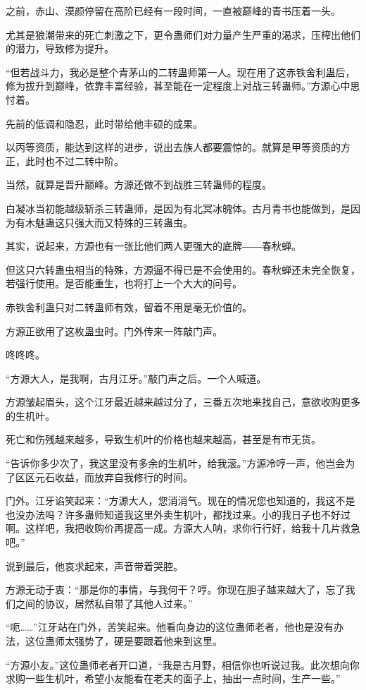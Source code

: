 \begin{this_body}
之前，赤山、漠颜停留在高阶已经有一段时间，一直被巅峰的青书压着一头。

尤其是狼潮带来的死亡刺激之下，更令蛊师们对力量产生严重的渴求，压榨出他们的潜力，导致修为提升。

“但若战斗力，我必是整个青茅山的二转蛊师第一人。现在用了这赤铁舍利蛊后，修为拔升到巅峰，依靠丰富经验，甚至能在一定程度上对战三转蛊师。”方源心中思忖着。

先前的低调和隐忍，此时带给他丰硕的成果。

以丙等资质，能达到这样的进步，说出去族人都要震惊的。就算是甲等资质的方正，此时也不过二转中阶。

当然，就算是晋升巅峰。方源还做不到战胜三转蛊师的程度。

白凝冰当初能越级斩杀三转蛊师，是因为有北冥冰魄体。古月青书也能做到，是因为有木魅蛊这只强大而又特殊的三转蛊虫。

其实，说起来，方源也有一张比他们两人更强大的底牌――春秋蝉。

但这只六转蛊虫相当的特殊，方源逼不得已是不会使用的。春秋蝉还未完全恢复，若强行使用。是否能重生，也将打上一个大大的问号。

赤铁舍利蛊只对二转蛊师有效，留着不用是毫无价值的。

方源正欲用了这枚蛊虫时。门外传来一阵敲门声。

咚咚咚。

“方源大人，是我啊，古月江牙。”敲门声之后。一个人喊道。

方源皱起眉头，这个江牙最近越来越过分了，三番五次地来找自己，意欲收购更多的生机叶。

死亡和伤残越来越多，导致生机叶的价格也越来越高，甚至是有市无货。

“告诉你多少次了，我这里没有多余的生机叶，给我滚。”方源冷哼一声，他岂会为了区区元石收益，而放弃自我修行的时间。

门外。江牙谄笑起来：“方源大人，您消消气。现在的情况您也知道的，我这不是也没办法吗？许多蛊师知道我这里外卖生机叶，都找过来。小的我日子也不好过啊。这样吧，我把收购价再提高一成。方源大人呐，求你行行好，给我十几片救急吧。”

说到最后，他哀求起来，声音带着哭腔。

方源无动于衷：“那是你的事情，与我何干？哼。你现在胆子越来越大了，忘了我们之间的协议，居然私自带了其他人过来。”

“呃……”江牙站在门外，苦笑起来。他看向身边的这位蛊师老者，他也是没有办法，这位蛊师太强势了，硬是要跟着他来到这里。

“方源小友。”这位蛊师老者开口道，“我是古月野，相信你也听说过我。此次想向你求购一些生机叶，希望小友能看在老夫的面子上，抽出一点时间，生产一些。”


\end{this_body}
